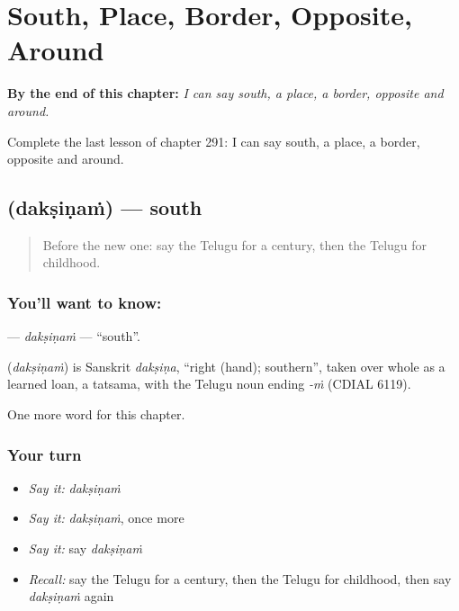 
\chapter{South, Place, Border, Opposite, Around}
\label{ch:te-south-place-border-opposite-around}

\begin{chapteropening}
\textbf{By the end of this chapter:} \emph{I can say south, a place, a border, opposite and around.}

Complete the last lesson of chapter 291: I can say south, a place, a border, opposite and around.
\end{chapteropening}

\section[\texorpdfstring{\te{దక్షిణం} (dakṣiṇaṁ)}{దక్షిణం (dakṣiṇaṁ)}]{ (dakṣiṇaṁ) — south}

\label{lesson:TE-C291-daksinam}



\begin{quote}
Before the new one: say the Telugu for a century, then the Telugu for childhood.
\end{quote}

\subsection*{You'll want to know: }
\textbf{} — \emph{dakṣiṇaṁ} — \textquotedblleft{}south\textquotedblright{}.

\begin{cousinweb}
\textbf{} (\emph{dakṣiṇaṁ}) is Sanskrit \emph{dakṣiṇa}, \textquotedblleft{}right (hand); southern\textquotedblright{}, taken over whole as a learned loan, a tatsama, with the Telugu noun ending \emph{-ṁ} (CDIAL 6119).
\end{cousinweb}

\begin{grammarlens}[title={What you've built}]
One more word for this chapter.
\end{grammarlens}

\subsection*{Your turn}
\begin{itemize}
\raggedright
  \item \emph{Say it:} \emph{dakṣiṇaṁ}
  \item \emph{Say it:} \emph{dakṣiṇaṁ}, once more
  \item \emph{Say it:} say \emph{dakṣiṇaṁ}
  \item \emph{Recall:} say the Telugu for a century, then the Telugu for childhood, then say \emph{dakṣiṇaṁ} again
\end{itemize}


